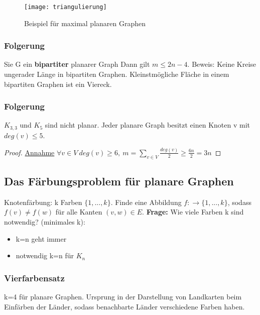 \begin{figure}[h]
    \begin{center}
        \texttt{[image: triangulierung]}
        \caption{Beispiel für maximal planaren Graphen}
        \label{fig:}
    \end{center}
\end{figure}


\subsubsection{Folgerung}
Sie G ein \textbf{bipartiter} planarer Graph Dann gilt $ m \leq 2n-4 $. Beweis: Keine Kreise ungerader Länge in bipartiten Graphen. Kleinstmögliche Fläche in einem bipartiten Graphen ist ein Viereck.

\subsubsection{Folgerung}
$ K_{3,3} $ und $ K_5 $ sind nicht planar. Jeder planare Graph besitzt einen Knoten v mit $ deg(v) \leq 5 $.
\begin{proof}
\underline{Annahme} $ \forall v \in V\ deg(v)\geq 6,\ m = \sum_{v\in V} \frac{deg(v)}{2} \geq \frac{6n}{2} = 3n$
\end{proof}

\subsection{Das Färbungsproblem für planare Graphen}
Knotenfärbung: k Farben $ \{1, ..., k \} $. Finde eine Abbildung $ f: \rightarrow \{1, ..., k \} $, sodass $ f(v) \neq f(w) $ für alle Kanten $ (v,w) \in E $. \textbf{Frage:} Wie viele Farben k sind notwendig? (minimales k):
\begin{itemize}
    \item k=n geht immer
    \item notwendig k=n für $ K_n $
\end{itemize}  
\subsubsection{Vierfarbensatz}
k=4 für planare Graphen. Ursprung in der Darstellung von Landkarten beim Einfärben der Länder, sodass benachbarte Länder verschiedene Farben haben.
